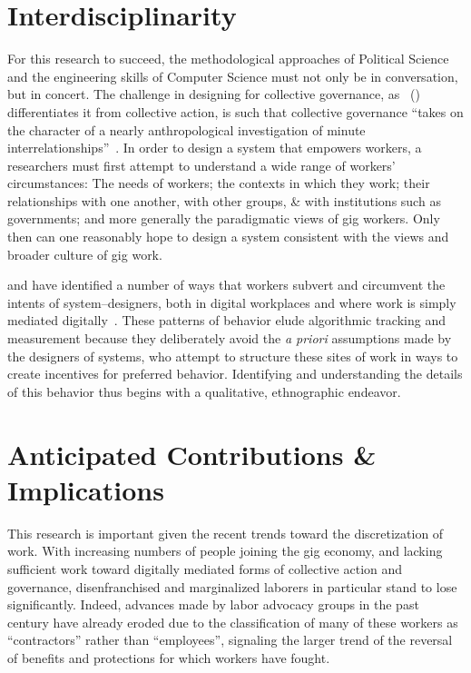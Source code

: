 \documentclass{article}
\begin{document}
\section*{Interdisciplinarity}
For this research to succeed, the methodological approaches of Political Science
and the engineering skills of Computer Science must not only be in conversation, but in concert.
The challenge in designing for collective governance,
as~\citeauthor{russell1982collective} (\citeyear{russell1982collective}) differentiates it from collective action,
is such that collective governance
``takes on the character of a nearly anthropological investigation of minute interrelationships''~\cite{russell1982collective}.
In order to design a system that empowers workers,
a researchers must first attempt to understand a wide range of workers' circumstances:
The needs of workers;
the contexts in which they work;
their relationships with one another, with other groups, \& with institutions such as governments;
and more generally the paradigmatic views of gig workers.
Only then can one reasonably hope to design a system consistent with the views and broader culture of gig work.

\citeauthor{uberAlgorithm} and \citeauthor{crowdcollab} have identified a number of ways that workers subvert and circumvent the intents of system--designers,
both in digital workplaces and where work is simply mediated digitally~\cite{uberAlgorithm,crowdcollab}.
These patterns of behavior elude algorithmic tracking and measurement because they deliberately avoid the \textit{a priori} assumptions made by the designers of systems,
who attempt to structure these sites of work in ways to create incentives for preferred behavior.
Identifying and understanding the details of this behavior thus begins with a qualitative,
ethnographic endeavor.

\section*{Anticipated Contributions \& Implications}
This research is important given the recent trends toward the discretization of work.
With increasing numbers of people joining the gig economy,
and lacking sufficient work toward digitally mediated forms of collective action and governance,
disenfranchised and marginalized laborers in particular stand to lose significantly.
Indeed, advances made by labor advocacy groups in the past century have already eroded
due to the classification of many of these workers as ``contractors'' rather than ``employees'',
signaling the larger trend of the reversal of benefits and protections for which workers have fought.
\end{document}
